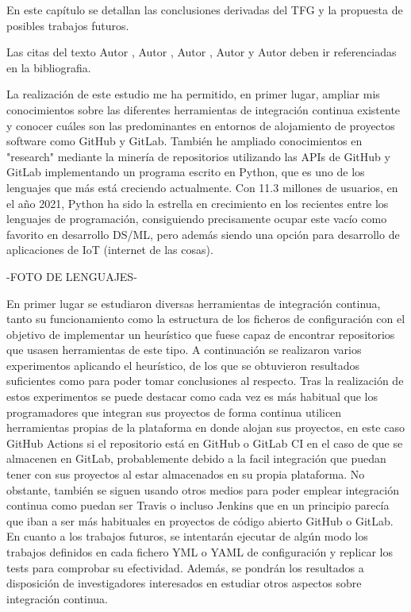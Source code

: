 En este capítulo se detallan las conclusiones derivadas del TFG y la propuesta de posibles trabajos futuros.

Las citas del texto Autor \cite{giaquinta}, Autor \cite{fortune}, Autor \cite{fortuneB}, Autor \cite{mitchell} y Autor \cite{morrey} deben ir referenciadas en la bibliografia.

La realización de este estudio me ha permitido, en primer lugar, ampliar mis conocimientos sobre las diferentes herramientas de integración continua existente y conocer cuáles son las predominantes en entornos de alojamiento de proyectos software como GitHub y GitLab.
También he ampliado conocimientos en "research" mediante la minería de repositorios utilizando las APIs de GitHub y GitLab implementando un programa escrito en Python, que es uno de los lenguajes que más está creciendo actualmente. 
Con 11.3 millones de usuarios, en el año 2021, Python ha sido la estrella en crecimiento en los recientes entre los lenguajes de programación, consiguiendo precisamente ocupar este vacío como favorito en desarrollo DS/ML, pero además siendo una opción para desarrollo de aplicaciones de IoT (internet de las cosas).

-FOTO DE LENGUAJES-

En primer lugar se estudiaron diversas herramientas de integración continua, tanto su funcionamiento como la estructura de los ficheros de configuración con el objetivo de implementar un heurístico que fuese capaz de encontrar repositorios que usasen herramientas de este tipo.
A continuación se realizaron varios experimentos aplicando el heurístico, de los que se obtuvieron resultados suficientes como para poder tomar conclusiones al respecto.
Tras la realización de estos experimentos se puede destacar como cada vez es más habitual que los programadores que integran sus proyectos de forma continua utilicen herramientas propias de la plataforma en donde alojan sus proyectos, en este caso GitHub Actions si el repositorio está en GitHub o GitLab CI en el caso de que se almacenen en GitLab, probablemente debido a la facil integración que puedan tener con sus proyectos al estar almacenados en su propia plataforma.
No obstante, también se siguen usando otros medios para poder emplear integración continua como puedan ser Travis o incluso Jenkins que en un principio parecía que iban a ser más habituales en proyectos de código abierto GitHub o GitLab.
En cuanto a los trabajos futuros, se intentarán ejecutar de algún modo los trabajos definidos en cada fichero YML o YAML de configuración y replicar los tests para comprobar su efectividad. Además, se pondrán los resultados a disposición de investigadores interesados en estudiar otros aspectos sobre integración continua.
